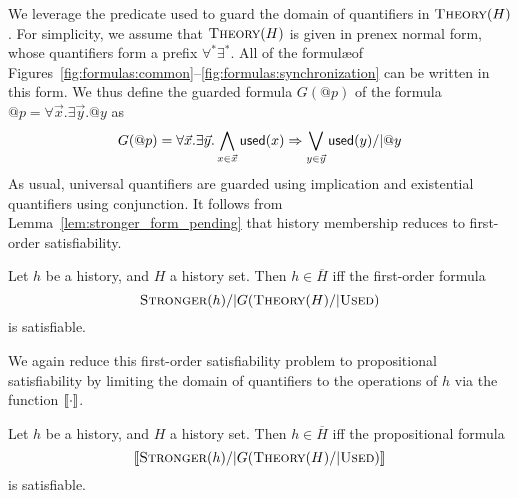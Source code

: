 We leverage the predicate {\sf used} to guard the domain of quantifiers in
$\textsc{Theory}(H)$. For simplicity, we assume that $\textsc{Theory}(H)$ is
given in prenex normal form, whose quantifiers form a prefix $\forall^*
\exists^*$. All of the formul\ae of
Figures~\ref{fig:formulas:common}--\ref{fig:formulas:synchronization} can be
written in this form. We thus define the guarded formula $G(@p)$ of the formula
$@p = \forall \vec{x}. \exists \vec{y}. @y$ as
\begin{align*}
  G(@p) = \forall \vec{x}. \exists \vec{y}.
  \bigwedge_{x \in \vec{x}} {\sf used}(x) => 
  \bigvee_{y \in \vec{y}} {\sf used}(y) /| @y
\end{align*}
As usual, universal quantifiers are guarded using implication and existential
quantifiers using conjunction. It follows from
Lemma~\ref{lem:stronger_form_pending} that history membership reduces to
first-order satisfiability.

\begin{theorem}
  \label{th:satisfiability_complete}

  Let $h$ be a history, and $H$ a history set. Then $h \in \overline{H}$ if{f}
  the first-order formula
  $$\textsc{Stronger}(h) /| G(\textsc{Theory}(H) /| \textsc{Used})$$
  is satisfiable.

\end{theorem}

We again reduce this first-order satisfiability problem to propositional
satisfiability by limiting the domain of quantifiers to the operations of $h$
via the function $[\![{\cdot}]\!]$.

\begin{corollary}
  \label{cor:satisfiability_pending}

  Let $h$ be a history, and $H$ a history set. Then $h \in \overline{H}$ if{f}
  the propositional formula
  $$[\![{\textsc{Stronger}(h) /| G(\textsc{Theory}(H) /| \textsc{Used})}]\!]$$
  is satisfiable.

\end{corollary}
